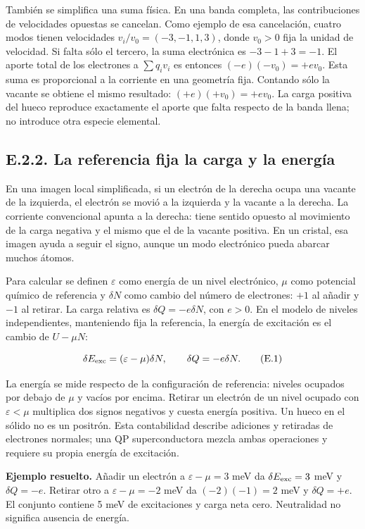 \documentclass[
  spanish,
  10pt,
  a4paper,
]{article}
\begin{document}
También se simplifica una suma física. En una banda completa, las
contribuciones de velocidades opuestas se cancelan. Como ejemplo de esa
cancelación, cuatro modos tienen velocidades \(v_i/v_0=(-3,-1,1,3)\),
donde \(v_0>0\) fija la unidad de velocidad. Si falta sólo el tercero,
la suma electrónica es \(-3-1+3=-1\). El aporte total de los electrones
a \(\sum q_i v_i\) es entonces \((-e)(-v_0)=+ev_0\). Esta suma es
proporcional a la corriente en una geometría fija. Contando sólo la
vacante se obtiene el mismo resultado: \((+e)(+v_0)=+ev_0\). La carga
positiva del hueco reproduce exactamente el aporte que falta respecto de
la banda llena; no introduce otra especie elemental.

\subsection{E.2.2. La referencia fija la carga y la
energía}\label{e.2.2.-la-referencia-fija-la-carga-y-la-energuxeda}

En una imagen local simplificada, si un electrón de la derecha ocupa una
vacante de la izquierda, el electrón se movió a la izquierda y la
vacante a la derecha. La corriente convencional apunta a la derecha:
tiene sentido opuesto al movimiento de la carga negativa y el mismo que
el de la vacante positiva. En un cristal, esa imagen ayuda a seguir el
signo, aunque un modo electrónico pueda abarcar muchos átomos.

Para calcular se definen \(\varepsilon\) como energía de un nivel
electrónico, \(\mu\) como potencial químico de referencia y \(\delta N\)
como cambio del número de electrones: \(+1\) al añadir y \(-1\) al
retirar. La carga relativa es \(\delta Q=-e\delta N\), con \(e>0\). En
el modelo de niveles independientes, manteniendo fija la referencia, la
energía de excitación es el cambio de \(U-\mu N\):

\[
\delta E_{\rm exc}=(\varepsilon-\mu)\delta N,
\qquad \delta Q=-e\delta N.
\tag{E.1}
\]

La energía se mide respecto de la configuración de referencia: niveles
ocupados por debajo de \(\mu\) y vacíos por encima. Retirar un electrón
de un nivel ocupado con \(\varepsilon<\mu\) multiplica dos signos
negativos y cuesta energía positiva. Un hueco en el sólido no es un
positrón. Esta contabilidad describe adiciones y retiradas de electrones
normales; una QP superconductora mezcla ambas operaciones y requiere su
propia energía de excitación.

\textbf{Ejemplo resuelto.} Añadir un electrón a \(\varepsilon-\mu=3\)
meV da \(\delta E_{\rm exc}=3\) meV y \(\delta Q=-e\). Retirar otro a
\(\varepsilon-\mu=-2\) meV da \((-2)(-1)=2\) meV y \(\delta Q=+e\). El
conjunto contiene 5 meV de excitaciones y carga neta cero. Neutralidad
no significa ausencia de energía.
\end{document}
